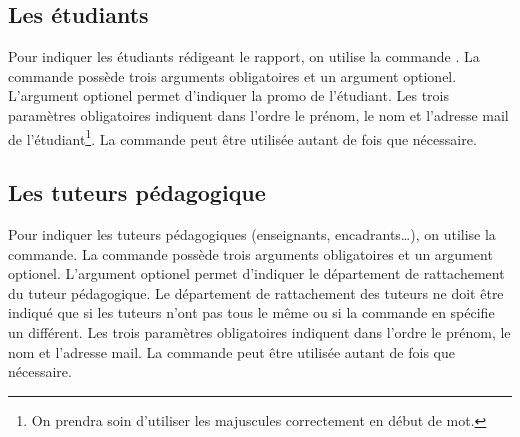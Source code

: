 \documentclass[overfullbox,hideweeklyreports,noseparatecontributorspage,nodate]{polytech}
\begin{document}
\subsection{Les étudiants}

Pour indiquer les étudiants rédigeant le rapport, on utilise la commande \latexcode{\\student}. La commande possède trois arguments obligatoires et un argument optionel. L'argument optionel permet d'indiquer la promo de l'étudiant. Les trois paramètres obligatoires indiquent dans l'ordre le prénom, le nom et l'adresse mail de l'étudiant\footnote{On prendra soin d'utiliser les majuscules correctement en début de mot.}. La commande  \latexcode{\\student} peut être utilisée autant de fois que nécessaire.

\begin{latexsource}
\end{latexsource}

\subsection{Les tuteurs pédagogique}

Pour indiquer les tuteurs pédagogiques (enseignants, encadrants\ldots), on utilise la commande\linebreak \latexcode{\\academicsupervisor}. La commande possède trois arguments obligatoires et un argument optionel. L'argument optionel permet d'indiquer le département de rattachement du tuteur pédagogique. Le département de rattachement des tuteurs ne doit être indiqué que si les tuteurs n'ont pas tous le même ou si la commande \latexcode{\\schooldepartment} en spécifie un différent. Les trois paramètres obligatoires indiquent dans l'ordre le prénom, le nom et l'adresse mail. La commande \linebreak \latexcode{\\academicsupervisor} peut être utilisée autant de fois que nécessaire.

\begin{latexsource}
\end{latexsource}
\end{document}
